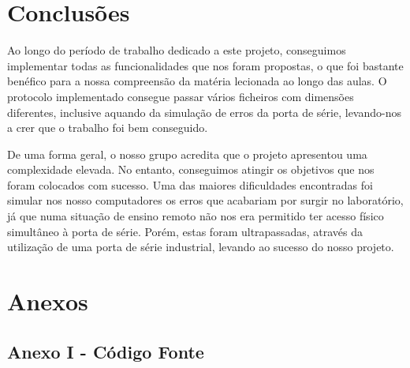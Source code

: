 \documentclass[article, a4paper, 11pt, oneside]{memoir}
\begin{document}
\chapter[Conclusões][Conclusões]{Conclusões} \label{\thechapter}

Ao longo do período de trabalho dedicado a este projeto, conseguimos implementar todas
as funcionalidades que nos foram propostas, o que foi bastante benéfico para a nossa compreensão
da matéria lecionada ao longo das aulas. O protocolo implementado consegue
passar vários ficheiros com dimensões diferentes, inclusive aquando da simulação de erros da porta de série,
levando-nos a crer que o trabalho foi bem conseguido. 

De uma forma geral, o nosso grupo acredita que o projeto apresentou uma complexidade elevada.
No entanto, conseguimos atingir os objetivos que nos foram colocados com sucesso. Uma das maiores
dificuldades encontradas foi simular nos nosso computadores os erros que acabariam por surgir 
no laboratório, já que numa situação de ensino remoto não nos era permitido ter acesso físico simultâneo 
à porta de série. Porém, estas foram ultrapassadas, através da utilização de uma porta de série industrial,
levando ao sucesso do nosso projeto.

\newpage

\chapter[Anexos][Anexos]{Anexos} \label{\thechapter}

\section{Anexo I - Código Fonte}


    
\newpage



\newpage


\end{document}
